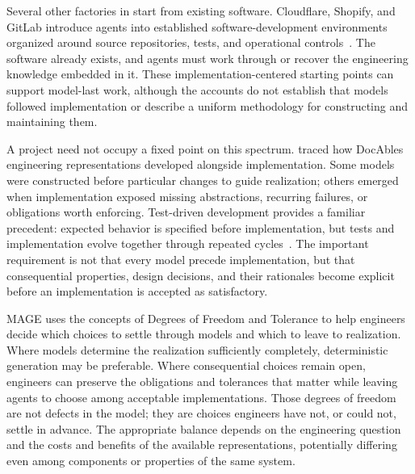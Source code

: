 Several other factories in  start from existing software. Cloudflare, Shopify, and GitLab introduce agents into established software-development environments organized around source repositories, tests, and operational controls~\citep{reimann2026codex, moreno2026river, gitlab2026customize}. The software already exists, and agents must work through or recover the engineering knowledge embedded in it. These implementation-centered starting points can support model-last work, although the accounts do not establish that models followed implementation or describe a uniform methodology for constructing and maintaining them.

A project need not occupy a fixed point on this spectrum.  traced how DocAble\textquotesingle s engineering representations developed alongside implementation. Some models were constructed before particular changes to guide realization; others emerged when implementation exposed missing abstractions, recurring failures, or obligations worth enforcing. Test-driven development provides a familiar precedent: expected behavior is specified before implementation, but tests and implementation evolve together through repeated cycles~\citep{beck2003tdd}. The important requirement is not that every model precede implementation, but that consequential properties, design decisions, and their rationales become explicit before an implementation is accepted as satisfactory.


MAGE uses the concepts of Degrees of Freedom and Tolerance to help engineers decide which choices to settle through models and which to leave to realization. Where models determine the realization sufficiently completely, deterministic generation may be preferable. Where consequential choices remain open, engineers can preserve the obligations and tolerances that matter while leaving agents to choose among acceptable implementations. Those degrees of freedom are not defects in the model; they are choices engineers have not, or could not, settle in advance. The appropriate balance depends on the engineering question and the costs and benefits of the available representations, potentially differing even among components or properties of the same system.
